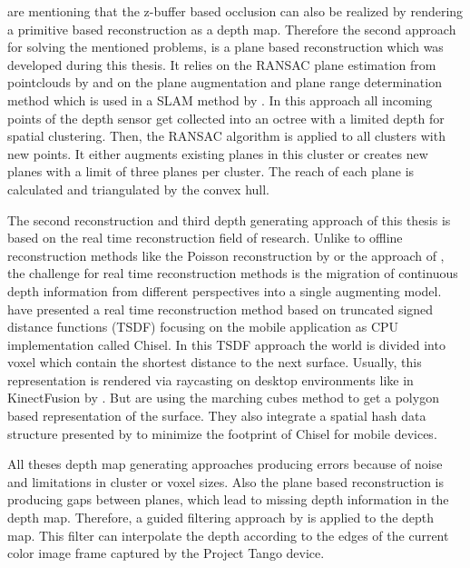 \documentclass[12pt]{support/thcolognereport}
\begin{document}
\citet{breen1996interactive} are mentioning that the z-buffer based occlusion can also be realized by rendering a primitive based reconstruction as a depth map. Therefore the second approach for solving the mentioned problems, is a plane based reconstruction which was developed during this thesis. It relies on the RANSAC plane estimation from pointclouds by \citet{yang2010plane} and on the plane augmentation and plane range determination method which is used in a SLAM method by \citet{trevor2012planar}. In this approach all incoming points of the depth sensor get collected into an octree with a limited depth for spatial clustering. Then, the RANSAC algorithm is applied to all clusters with new points. It either augments existing planes in this cluster or creates new planes with a limit of three planes per cluster. The reach of each plane is calculated and triangulated by the convex hull. 

The second reconstruction and third depth generating approach of this thesis is based on the real time reconstruction field of research. Unlike to offline reconstruction methods like the Poisson reconstruction by \citet{kazhdan2006poisson} or the approach of \citet{hoppe1992surface}, the challenge for real time reconstruction methods is the migration of continuous depth information from different perspectives into a single augmenting model. \citet{Klingensmith_2015_7924} have presented a real time reconstruction method based on truncated signed distance functions (TSDF) focusing on the mobile application as CPU implementation called Chisel. In this TSDF approach the world is divided into voxel which contain the shortest distance to the next surface. Usually, this representation is rendered via raycasting on desktop environments like in KinectFusion by \citet{newcombe2011kinectfusion}. But \citet{Klingensmith_2015_7924} are using the marching cubes method to get a polygon based representation of the surface. They also integrate a spatial hash data structure presented by \citet{niessner2013real} to minimize the footprint of Chisel for mobile devices.

All theses depth map generating approaches producing errors because of noise and limitations in cluster or voxel sizes. Also the plane based reconstruction is producing gaps between planes, which lead to missing depth information in the depth map. Therefore, a guided filtering approach by \citet{he2010guided} is applied to the depth map. This filter can interpolate the depth according to the edges of the current color image frame captured by the Project Tango device. 
\end{document}
